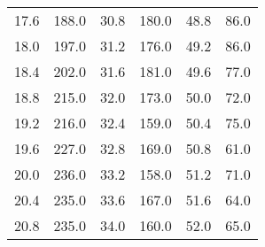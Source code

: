 \begin{table}
\begin{tabular}{c c | c c | c c}
     17.6	& 188.0 & 30.8 & 180.0 & 48.8 & 86.0  \\
     18.0	& 197.0 & 31.2 & 176.0 & 49.2 & 86.0  \\
     18.4	& 202.0 & 31.6 & 181.0 & 49.6 & 77.0  \\
     18.8	& 215.0 & 32.0 & 173.0 & 50.0 & 72.0  \\
     19.2	& 216.0 & 32.4 & 159.0 & 50.4 & 75.0  \\
     19.6	& 227.0 & 32.8 & 169.0 & 50.8 & 61.0  \\
     20.0	& 236.0 & 33.2 & 158.0 & 51.2 & 71.0  \\
     20.4	& 235.0 & 33.6 & 167.0 & 51.6 & 64.0  \\
     20.8	& 235.0 & 34.0 & 160.0 & 52.0 & 65.0  \\
    \bottomrule
  \end{tabular}
\end{table}
